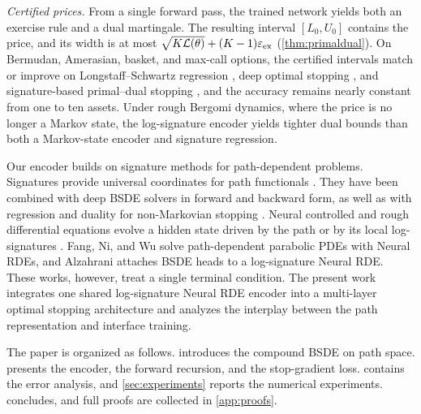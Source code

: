 \emph{Certified prices.} From a single forward pass, the trained network yields both an exercise rule and a dual martingale. The resulting interval $[L_0,U_0]$ contains the price, and its width is at most $\sqrt{K\mathcal{L}(\theta)}+(K-1)\varepsilon_{\mathrm{ex}}$ (\cref{thm:primaldual}). On Bermudan, Amerasian, basket, and max-call options, the certified intervals match or improve on Longstaff--Schwartz regression \cite{longstaff2001}, deep optimal stopping \cite{becker2019}, and signature-based primal--dual stopping \cite{bayer2025primal}, and the accuracy remains nearly constant from one to ten assets. Under rough Bergomi dynamics, where the price is no longer a Markov state, the log-signature encoder yields tighter dual bounds than both a Markov-state encoder and signature regression.

Our encoder builds on signature methods for path-dependent problems. Signatures provide universal coordinates for path functionals \cite{lyons1998,cuchiero2025}. They have been combined with deep BSDE solvers in forward \cite{feng2023,sun2025} and backward \cite{bayraktar2024} form, as well as with regression and duality for non-Markovian stopping \cite{bayer2025primal,bayer2026stopping}. Neural controlled and rough differential equations evolve a hidden state driven by the path or by its local log-signatures \cite{kidger2020,morrill2021}. Fang, Ni, and Wu \cite{fang2026} solve path-dependent parabolic PDEs with Neural RDEs, and Alzahrani \cite{alzahrani2025} attaches BSDE heads to a log-signature Neural RDE. These works, however, treat a single terminal condition. The present work integrates one shared log-signature Neural RDE encoder into a multi-layer optimal stopping architecture and analyzes the interplay between the path representation and interface training.

The paper is organized as follows.  introduces the compound BSDE on path space.  presents the encoder, the forward recursion, and the stop-gradient loss.  contains the error analysis, and \cref{sec:experiments} reports the numerical experiments.  concludes, and full proofs are collected in \cref{app:proofs}.
